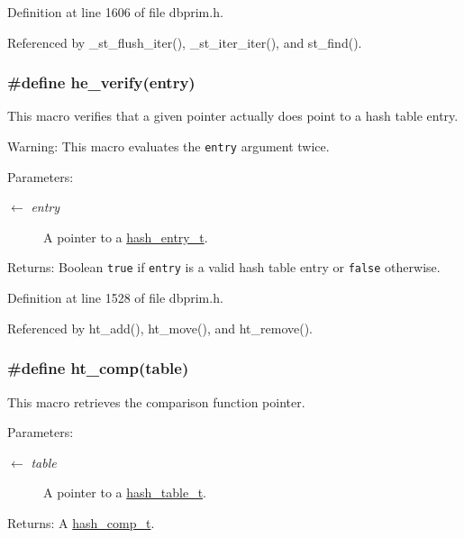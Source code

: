 Definition at line 1606 of file dbprim.h.

Referenced by \_\-st\_\-flush\_\-iter(), \_\-st\_\-iter\_\-iter(), and st\_\-find().\hypertarget{group__dbprim__hash_ga39}{
\subsubsection[he\_\-verify]{\setlength{\rightskip}{0pt plus 5cm}\#define he\_\-verify(entry)}}
\label{group__dbprim__hash_ga39}


This macro verifies that a given pointer actually does point to a hash table entry.

\begin{Desc}
\item[Warning:]This macro evaluates the {\tt entry} argument twice.\end{Desc}
\begin{Desc}
\item[Parameters:]
\begin{description}
\item[\mbox{$\leftarrow$} {\em entry}]A pointer to a \hyperlink{group__dbprim__hash_ga2}{hash\_\-entry\_\-t}.\end{description}
\end{Desc}
\begin{Desc}
\item[Returns:]Boolean {\tt true} if {\tt entry} is a valid hash table entry or {\tt false} otherwise.\end{Desc}


Definition at line 1528 of file dbprim.h.

Referenced by ht\_\-add(), ht\_\-move(), and ht\_\-remove().\hypertarget{group__dbprim__hash_ga33}{
\subsubsection[ht\_\-comp]{\setlength{\rightskip}{0pt plus 5cm}\#define ht\_\-comp(table)}}
\label{group__dbprim__hash_ga33}


This macro retrieves the comparison function pointer.

\begin{Desc}
\item[Parameters:]
\begin{description}
\item[\mbox{$\leftarrow$} {\em table}]A pointer to a \hyperlink{group__dbprim__hash_ga1}{hash\_\-table\_\-t}.\end{description}
\end{Desc}
\begin{Desc}
\item[Returns:]A \hyperlink{group__dbprim__hash_ga5}{hash\_\-comp\_\-t}.\end{Desc}


